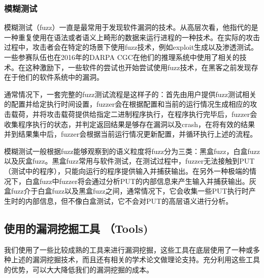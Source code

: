 \documentclass[doctor,privacy,twoside]{buaa_mac}
\begin{document}
\subsubsection{模糊测试}

模糊测试（fuzz）一直是最常用于发现软件漏洞的技术。从高层次看，他指代的是一种重复使用在语法或者语义上畸形的数据来运行进程的一种技术。在实际的攻击过程中，攻击者会在特定的场景下使用fuzz技术，例如exploit生成以及渗透测试。一些参赛队伍也在2016年的DARPA CGC在他们的推理系统中使用了相关的技术。在这种激励下，一些软件的尝试也开始尝试使用fuzz技术，在黑客之前发现存在于他们的软件系统中的漏洞。

通常情况下，一套完整的fuzz测试流程是这样子的：首先由用户提供fuzz测试相关的配置并给定执行时间设置，fuzzer会在根据配置和当前的运行情况生成相应的攻击载荷，并将攻击载荷提供给指定二进制程序执行，在程序执行完毕后，fuzzer会收集程序执行的状态，并判定返回结果是够存在漏洞以及crash，在将有效的结果并到结果集中后，fuzzer会根据当前运行情况更新配置，并循环执行上述的流程。

模糊测试一般根据fuzz能够观察到的语义粒度将fuzz分为三类：黑盒fuzz，白盒fuzz以及灰盒fuzz。黑盒fuzz常用与软件测试，在测试过程中，fuzzer无法接触到PUT（测试中的程序），只能向运行的程序提供输入并捕获输出。在另外一种极端的情况下，白盒fuzz中fuzzer将会通过分析PUT的内部信息来产生输入并捕获输出。灰盒fuzz介于白盒fuzz以及黑盒fuzz之间，通常情况下，它会收集一些PUT执行时产生时的内部信息，但不像白盒测试，它不会对PUT的高层语义进行分析。



\subsection{使用的漏洞挖掘工具 （Tools)}
我们使用了一些比较成熟的工具来进行漏洞挖掘，这些工具在底层使用了一种或多种上述的漏洞挖掘技术，而且还有相关的学术论文做理论支持。充分利用这些工具的优势，可以大大降低我们的漏洞挖掘的成本。
\end{document}
